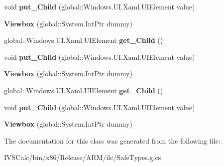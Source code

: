 \begin{DoxyCompactItemize}
\item 
\mbox{\label{class_windows_1_1_u_i_1_1_xaml_1_1_controls_1_1_viewbox_a378c3b98440e0807fc9f12b3dc0ee44c}} 
void {\bfseries put\+\_\+\+Child} (global\+::\+Windows.\+U\+I.\+Xaml.\+U\+I\+Element value)
\item 
\mbox{\label{class_windows_1_1_u_i_1_1_xaml_1_1_controls_1_1_viewbox_ae6244c803bd36c5ac2d03e5b8e842f87}} 
{\bfseries Viewbox} (global\+::\+System.\+Int\+Ptr dummy)
\item 
\mbox{\label{class_windows_1_1_u_i_1_1_xaml_1_1_controls_1_1_viewbox_a40524be89c752d819130bc37f8d21c75}} 
global\+::\+Windows.\+U\+I.\+Xaml.\+U\+I\+Element {\bfseries get\+\_\+\+Child} ()
\item 
\mbox{\label{class_windows_1_1_u_i_1_1_xaml_1_1_controls_1_1_viewbox_a378c3b98440e0807fc9f12b3dc0ee44c}} 
void {\bfseries put\+\_\+\+Child} (global\+::\+Windows.\+U\+I.\+Xaml.\+U\+I\+Element value)
\item 
\mbox{\label{class_windows_1_1_u_i_1_1_xaml_1_1_controls_1_1_viewbox_ae6244c803bd36c5ac2d03e5b8e842f87}} 
{\bfseries Viewbox} (global\+::\+System.\+Int\+Ptr dummy)
\item 
\mbox{\label{class_windows_1_1_u_i_1_1_xaml_1_1_controls_1_1_viewbox_a40524be89c752d819130bc37f8d21c75}} 
global\+::\+Windows.\+U\+I.\+Xaml.\+U\+I\+Element {\bfseries get\+\_\+\+Child} ()
\item 
\mbox{\label{class_windows_1_1_u_i_1_1_xaml_1_1_controls_1_1_viewbox_a378c3b98440e0807fc9f12b3dc0ee44c}} 
void {\bfseries put\+\_\+\+Child} (global\+::\+Windows.\+U\+I.\+Xaml.\+U\+I\+Element value)
\item 
\mbox{\label{class_windows_1_1_u_i_1_1_xaml_1_1_controls_1_1_viewbox_ae6244c803bd36c5ac2d03e5b8e842f87}} 
{\bfseries Viewbox} (global\+::\+System.\+Int\+Ptr dummy)
\end{DoxyCompactItemize}


The documentation for this class was generated from the following file\+:\begin{DoxyCompactItemize}
\item 
I\+V\+S\+Calc/bin/x86/\+Release/\+A\+R\+M/ilc/Safe\+Types.\+g.\+cs\end{DoxyCompactItemize}
